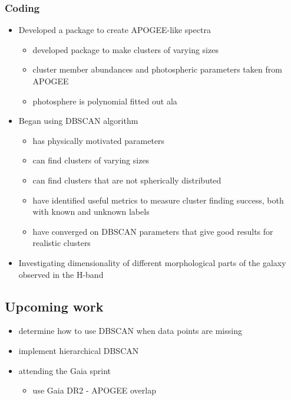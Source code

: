 \documentclass[11pt]{article}
\begin{document}
    \subsubsection*{Coding}
    
    \begin{itemize}
    	\item Developed a package to create APOGEE-like spectra
    	\begin{itemize}
    		\item developed package to make clusters of varying sizes
    		\item cluster member abundances and photospheric parameters taken from APOGEE
    		\item photosphere is polynomial fitted out ala \citet{Price-Jones2017}
    	\end{itemize}
    	\item Began using DBSCAN algorithm
    	\begin{itemize}
    		\item has physically motivated parameters
    		\item can find clusters of varying sizes
    		\item can find clusters that are not spherically distributed
    		\item have identified useful metrics to measure cluster finding success, both with known and unknown labels
    		\item have converged on DBSCAN parameters that give good results for realistic clusters
    	\end{itemize}
    	\item Investigating dimensionality of different morphological parts of the galaxy observed in the H-band
    \end{itemize}
    

    
    \subsection*{Upcoming work} 
    \begin{itemize}
    \item determine how to use DBSCAN when data points are missing
    \item implement hierarchical DBSCAN
    \item attending the Gaia sprint
   		\begin{itemize}
   		\item use Gaia DR2 - APOGEE overlap
   		\end{itemize}
    \end{itemize}
    
\end{document}

